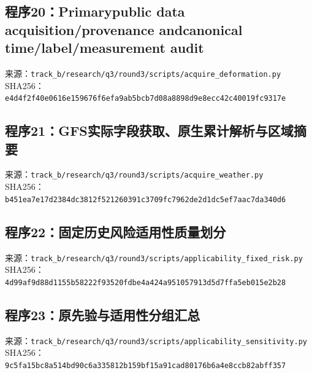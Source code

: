 \subsection*{程序20：Primarypublic data acquisition/provenance andcanonical time/label/measurement audit}
\noindent 来源：\nolinkurl{track_b/research/q3/round3/scripts/acquire_deformation.py}\\
\noindent SHA256：\texttt{e4d4f2f40e0616e159676f6efa9ab5bc}\allowbreak\texttt{b7d08a8898d9e8ecc42c40019fc9317e}\\
\clearpage
\subsection*{程序21：GFS实际字段获取、原生累计解析与区域摘要}
\noindent 来源：\nolinkurl{track_b/research/q3/round3/scripts/acquire_weather.py}\\
\noindent SHA256：\texttt{b451ea7e17d2384dc3812f521260391c}\allowbreak\texttt{3709fc7962de2d1dc5ef7aac7da340d6}\\
\clearpage
\subsection*{程序22：固定历史风险适用性质量划分}
\noindent 来源：\nolinkurl{track_b/research/q3/round3/scripts/applicability_fixed_risk.py}\\
\noindent SHA256：\texttt{4d99af9d88d1155b58222f93520fdbe4}\allowbreak\texttt{a424a951057913d5d7ffa5eb015e2b28}\\
\clearpage
\subsection*{程序23：原先验与适用性分组汇总}
\noindent 来源：\nolinkurl{track_b/research/q3/round3/scripts/applicability_sensitivity.py}\\
\noindent SHA256：\texttt{9c5fa15bc8a514bd90c6a335812b159b}\allowbreak\texttt{f15a91cad80176b6a4e8ccb82abff357}\\
\clearpage
